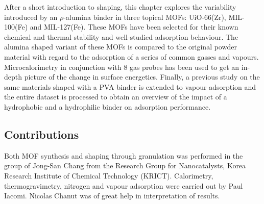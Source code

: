 After a short introduction to shaping, this chapter explores the 
variability introduced by an \( \rho \)-alumina binder in three 
topical \glspl{MOF}: UiO-66(Zr), MIL-100(Fe) and MIL-127(Fe). These \glspl{MOF} 
have been selected for their known chemical and thermal stability 
and well-studied adsorption behaviour.
The alumina shaped variant of these \glspl{MOF} is compared to the original
powder material with regard to the adsorption of a series of common
gasses and vapours. Microcalorimetry in conjunction with 8 gas probes
has been used to get an in-depth picture of the change in surface
energetics.
Finally, a previous study on the same materials shaped with a \gls{PVA}
binder is extended to vapour adsorption and the entire
dataset is processed to obtain an overview of the impact of a
hydrophobic and a hydrophilic binder on adsorption performance.

\subsection*{Contributions}

Both \gls{MOF} synthesis and shaping through granulation was performed in
the group of Jong-San Chang from the Research Group for Nanocatalysts,
Korea Research Institute of Chemical Technology (KRICT). Calorimetry,
thermogravimetry, nitrogen and vapour adsorption were carried out by
Paul Iacomi. Nicolas Chanut was of great help in interpretation 
of results.

